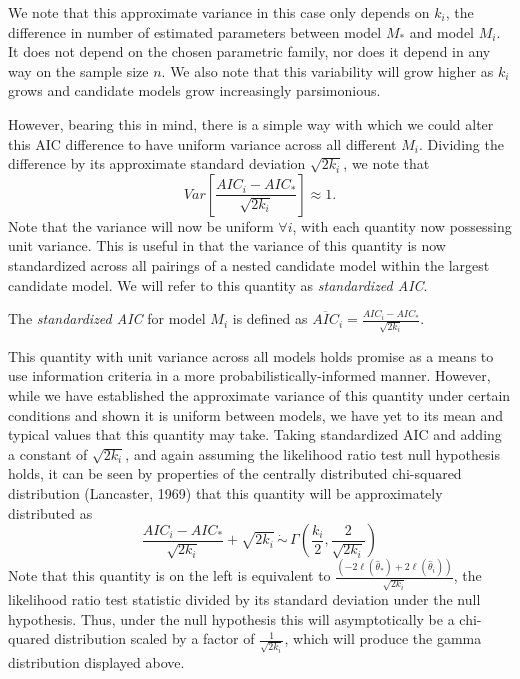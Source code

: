 		We note that this approximate variance in this case only depends on $k_i$, the difference in number of estimated parameters between model $M_*$ and model $M_i$. It does not
		depend on the chosen parametric family, nor does it depend in any way on the sample size $n$. We also note that this variability will grow higher as $k_i$ grows and candidate
		models grow increasingly parsimonious.

		However, bearing this in mind, there is a simple way with which we could alter this AIC difference to have uniform variance across all different $M_i$. Dividing the difference
		by its approximate standard deviation $\sqrt{2 k_i}$, we note that
		\begin{equation}
			Var \left[ \frac{AIC_i - AIC_*}{\sqrt{2k_i}} \right] \approx 1 .
		\end{equation}
		Note that the variance will now be uniform $\forall i$, with each quantity now possessing unit variance. This is useful in that the variance of this quantity is now standardized
		across all pairings of a nested candidate model within the largest candidate model. We will refer to this quantity as \textit{standardized AIC}.

		\begin{definition}
			The \textit{standardized AIC} for model $M_i$ is defined as $\overline{AIC}_i = \frac{AIC_i - AIC_*}{\sqrt{2k_i}}$.
		\end{definition}

		This quantity with unit variance across all models holds promise as a means to use information criteria in a more probabilistically-informed manner. However, while we have established
		the approximate variance of this quantity under certain conditions and shown it is uniform between models, we have yet to its mean and typical values that this quantity may take. Taking
		standardized AIC and adding a constant of $\sqrt{2 k_i}$, and again assuming the likelihood ratio test null hypothesis holds, it can be seen by properties of the centrally distributed
		chi-squared distribution (Lancaster, 1969) that this quantity will be approximately distributed as
		\begin{equation}
			\frac{AIC_i - AIC_*}{\sqrt{2k_i}} + \sqrt{2k_i} \, \dot\sim \, \Gamma \left( \frac{k_i}{2}, \frac{2}{\sqrt{2k_i}} \right)
		\end{equation}
		Note that this quantity is on the left is equivalent to $\frac{ \left( -2 \ell (\hat{\theta}_*) + 2 \ell (\hat{\theta}_i) \right) }{\sqrt{2k_i}}$, the likelihood ratio test statistic
		divided by its standard deviation under the null hypothesis. Thus, under the null hypothesis this will asymptotically be a chi-quared distribution scaled by a factor of $\frac{1}{\sqrt{2k_i}}$,
		which will produce the gamma distribution displayed above.

